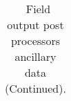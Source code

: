 \begin{table}
\begin{center}
\begin{tabular}{|c|c|c|c|c|}
\end{tabular} \end{center}
\caption{~Field output post processors ancillary data (Continued).} \label{tab:fields_part2}
\vspace{0.5in}
\end{table}

\clearpage

